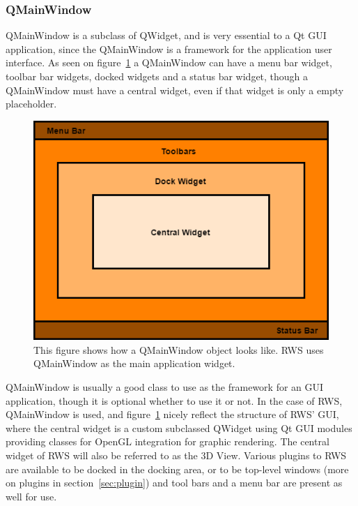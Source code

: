 \subsubsection{QMainWindow}
QMainWindow is a subclass of QWidget, and is very essential to a Qt GUI application, since the QMainWindow is a framework for the application user interface. As seen on figure~\ref{fig:QMainWindowExample} a QMainWindow can have a menu bar widget, toolbar bar widgets, docked widgets and a status bar widget, though a QMainWindow must have a central widget, even if that widget is only a empty placeholder. 

\begin{figure}[h]
	\centering
	\includegraphics[scale=0.55]{Figures/QMainWindowExample.png}
	\caption{This figure shows how a QMainWindow object looks like. RWS uses QMainWindow as the main application widget.}
	\label{fig:QMainWindowExample}
\end{figure}

QMainWindow is usually a good class to use as the framework for an GUI application, though it is optional whether to use it or not. In the case of RWS, QMainWindow is used, and figure~\ref{fig:QMainWindowExample} nicely reflect the structure of RWS' GUI, where the central widget is a custom subclassed QWidget using Qt GUI modules providing classes for OpenGL integration for graphic rendering. The central widget of RWS will also be referred to as the 3D View. Various plugins to RWS are available to be docked in the docking area, or to be top-level windows (more on plugins in section~\ref{sec:plugin}) and tool bars and a menu bar are present as well for use.

